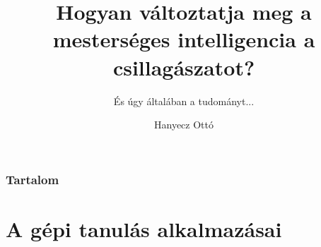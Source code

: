 \documentclass{beamer}
\title[MI a csillagászatban]{Hogyan változtatja meg a mesterséges intelligencia a csillagászatot?}
\subtitle{És úgy általában a tudományt...}
\author{Hanyecz Ottó}
\date[MTT, \today]
{
\begin{columns}
    \begin{column}{0.9\textwidth}
        \centering
        \begin{Large}
            Polaris Csillagvizsgáló \\
        \end{Large}
        \vspace*{0.5cm}
        Budapest \\
        \vspace*{0.5cm}
        2020. október 26.
    \end{column}
\end{columns}
}
\begin{document}
\begin{frame}
    \titlepage
\end{frame}

\begin{frame}
    \frametitle{Tartalom}
    \tableofcontents
\end{frame}



\section{A gépi tanulás alkalmazásai}


\end{document}
